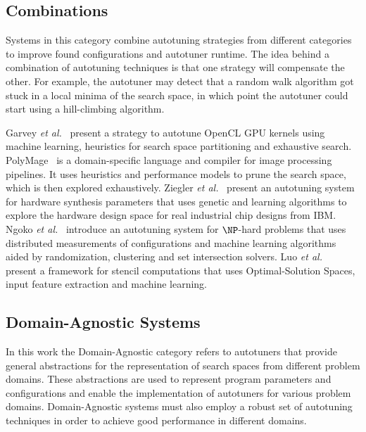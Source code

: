 \subsection{Combinations}

Systems in this category combine autotuning strategies from different
categories to improve found configurations and autotuner runtime.  The idea
behind a combination of autotuning techniques is that one strategy will
compensate the other. For example, the autotuner may detect that a random walk
algorithm got stuck in a local minima of the search space, in which point the
autotuner could start using a hill-climbing algorithm.

Garvey \emph{et al.}~\cite{garvey2015automatic} present a strategy to autotune
OpenCL GPU kernels using machine learning, heuristics for search space
partitioning and exhaustive search.  PolyMage~\cite{mullapudi2015polymage} is a
domain-specific language and compiler for image processing pipelines. It uses
heuristics and performance models to prune the search space, which is then
explored exhaustively.  Ziegler \emph{et
al.}~\cite{ziegler2016synthesis,ziegler2016scalable} present an autotuning
system for hardware synthesis parameters that uses genetic and learning
algorithms to explore the hardware design space for real industrial chip
designs from IBM.  Ngoko \emph{et al.}~\cite{ngoko2016automatic} introduce an
autotuning system for $\NP$-hard problems that uses distributed measurements of
configurations and machine learning algorithms aided by randomization,
clustering and set intersection solvers.  Luo \emph{et al.}~\cite{luo2015fast}
present a framework for stencil computations that uses Optimal-Solution Spaces,
input feature extraction and machine learning.

\subsection{Domain-Agnostic Systems}

In this work the Domain-Agnostic category refers to autotuners that provide
general abstractions for the representation of search spaces from different
problem domains. These abstractions are used to represent program parameters
and configurations and enable the implementation of autotuners for various
problem domains. Domain-Agnostic systems must also employ a robust set of
autotuning techniques in order to achieve good performance in different
domains.

